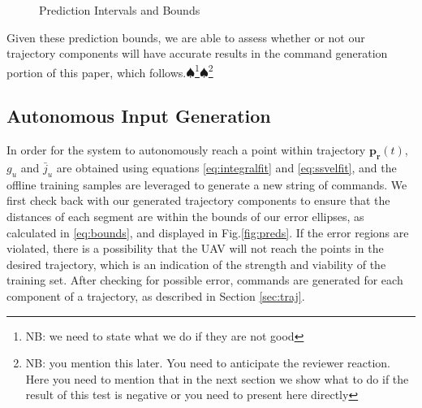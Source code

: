 \documentclass[letterpaper, 10 pt, conference]{ieeeconf}  %
\newcommand\NB[1]{$\spadesuit$\footnote{NB: #1}}
\begin{document}
\begin{figure}[ht]
	\centering
	\caption{Prediction Intervals and Bounds}
	\label{fig:bounds}
\end{figure}

Given these prediction bounds, we are able to assess whether or not our trajectory components will have accurate results in the command generation portion of this paper, which follows.\NB{we need to state what we do if they are not good}\NB{you mention this later. You need to anticipate the reviewer reaction. Here you need to mention that in the next section we show what to do if the result of this test is negative or you need to present here directly}

\subsection{Autonomous Input Generation} \label{sec:generate}

In order for the system to autonomously reach a point within trajectory $\bm{p_r}(t)$, $g_u$ and $\bar{j}_u$ are obtained using equations \eqref{eq:integralfit} and \eqref{eq:ssvelfit}, and the offline training samples are leveraged to generate a new string of commands. We first check back with our generated trajectory components to ensure that the distances of each segment are within the bounds of our error ellipses, as calculated in \eqref{eq:bounds}, and displayed in Fig.\ref{fig:preds}. If the error regions are violated, there is a possibility that the UAV will not reach the points in the desired trajectory, which is an indication of the strength and viability of the training set. After checking for possible error, commands are generated for each component of a trajectory, as described in Section \ref{sec:traj}.
\end{document}
